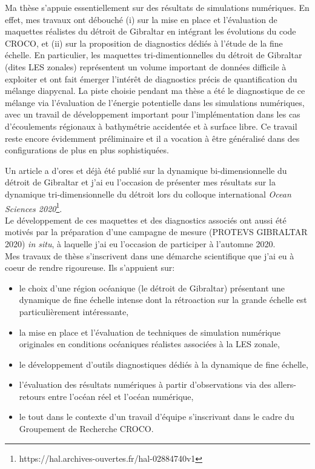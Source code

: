 Ma thèse s'appuie essentiellement sur des résultats de simulations numériques. En effet, mes travaux ont débouché (i) sur la mise en place et l'évaluation de maquettes réalistes du détroit de Gibraltar en intégrant les évolutions du code CROCO, et (ii) sur la proposition de diagnostics dédiés à l'étude de la fine échelle. En particulier, les maquettes tri-dimentionnelles du détroit de Gibraltar (dites LES zonales) représentent un volume important de données difficile à exploiter et ont fait émerger l'intérêt de diagnostics précis de quantification du mélange diapycnal. La piste choisie pendant ma thèse a été le diagnostique de ce mélange via l'évaluation de l'énergie potentielle dans les simulations numériques, avec un travail de développement important pour l'implémentation dans les cas d'écoulements régionaux à bathymétrie accidentée et à surface libre. Ce travail reste encore évidemment préliminaire et il a vocation à être généralisé dans des configurations de plus en plus sophistiquées.

Un article a d'ores et déjà été publié sur la dynamique bi-dimensionnelle du détroit de Gibraltar \citep{hilt_2020} et j'ai eu l'occasion de présenter mes résultats sur la dynamique tri-dimensionnelle du détroit lors du colloque international \textit{Ocean Sciences 2020}\footnote{https://hal.archives-ouvertes.fr/hal-02884740v1}.\\

Le développement de ces maquettes et des diagnostics associés ont aussi été motivés par la préparation d'une campagne de mesure (PROTEVS GIBRALTAR 2020) \textit{in situ}, à laquelle j'ai eu l'occasion de participer à l'automne 2020. \\


Mes travaux de thèse s'inscrivent  dans une démarche scientifique que j'ai eu à coeur de rendre rigoureuse. Ils s'appuient sur:
\begin{itemize}
\setlength\itemsep{0pt}
    \item le choix d'une région océanique (le détroit de Gibraltar) présentant une dynamique de fine échelle intense dont la rétroaction sur la grande échelle est particulièrement intéressante,
    \item la mise en place et l'évaluation de techniques de simulation numérique originales en conditions océaniques réalistes associées à la LES zonale,
    \item le développement d'outils diagnostiques dédiés à la dynamique de fine échelle,
    \item l'évaluation des résultats numériques à partir d'observations via des allers-retours entre l'océan réel et l'océan numérique,
    \item le tout dans le contexte d'un travail d'équipe s'inscrivant dans le cadre du Groupement de Recherche CROCO.
\end{itemize}

